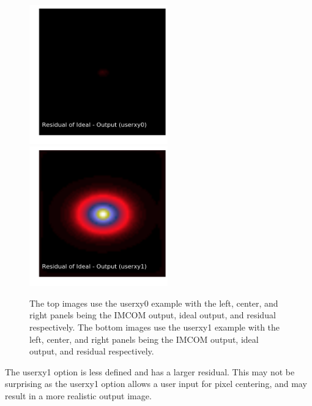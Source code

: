 \documentclass[12pt,preprint]{aastex6}
\begin{document}
\begin{figure}[!htbp]
\includegraphics[height=60mm,width=60mm]{f2f.png}
\includegraphics[height=60mm,width=60mm]{f2g.png}
\caption{The top images use the userxy0 example with the left, center, and right panels being the IMCOM output, ideal output, and residual respectively. The bottom images use the userxy1 example with the left, center, and right panels being the IMCOM output, ideal output, and residual respectively.}
\label{fig:varyxy0andxy1}
\end{figure}
The userxy1 option is less defined and has a larger residual. This may not be surprising as the userxy1 option allows a user input for pixel centering, and may result in a more realistic output image.
\end{document}
